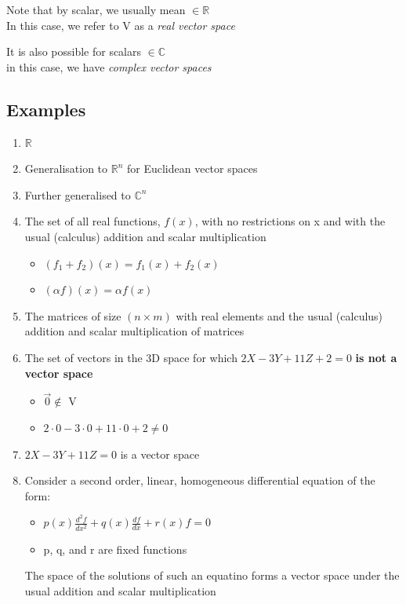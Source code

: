 \documentclass[a4paper, 11pt, normalem]{report}
\begin{document}
Note that by scalar, we usually mean $\in \mathbb{R}$ \\
In this case, we refer to V as a \emph{real vector space}

It is also possible for scalars $\in \mathbb{C}$ \\
in this case, we have \emph{complex vector spaces}

\subsection{Examples}
\begin{enumerate}
    \item $\mathbb{R}$
    \item Generalisation to $\mathbb{R}^n$ for Euclidean vector spaces
    \item Further generalised to $\mathbb{C}^n$
    \item The set of all real functions, $f(x)$, with no restrictions on x and with the usual (calculus) addition and scalar multiplication
        \begin{itemize}
            \item $(f_1 + f_2 )(x) = f_{1}(x) + f_{2}(x)$
            \item $(\alpha f)(x) = \alpha f(x)$
        \end{itemize}
    \item The matrices of size $(n \times m)$ with real elements and the usual (calculus) addition and scalar multiplication of matrices
    \item The set of vectors in the 3D space for which $2X - 3Y + 11Z + 2 = 0$ \textbf{is not a vector space}
        \begin{itemize}
            \item $\vec{0} \notin$ V
            \item $2\cdot0 - 3\cdot0 + 11\cdot0 + 2 \neq 0$
        \end{itemize}
    \item $2X - 3Y + 11Z = 0$ is a vector space
    \item Consider a second order, linear, homogeneous differential equation of the form:
        \begin{itemize}
            \item $p(x)\frac{d^{2}f}{dx^2} + q(x)\frac{df}{dx} + r(x)f = 0$
            \item p, q, and r are fixed functions
        \end{itemize}
        The space of the solutions of such an equatino forms a vector space under the usual addition and scalar multiplication
\end{enumerate}
\end{document}
